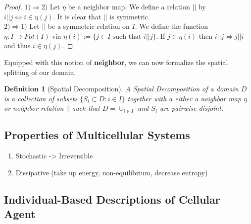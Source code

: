 \documentclass{article}
\newtheorem{definition}{Definition}[section]
\begin{document}
\begin{proof}
    $1) \Rightarrow 2)$ Let $\eta$ be a neighbor map.
    We define a relation $||$ by $i||j \Leftrightarrow i\in\eta(j)$.
    It is clear that $||$ is symmetric.\\
    $2) \Rightarrow 1)$ Let $||$ be a symmetric relation on $I$.
    We define the function $\eta:I\rightarrow Pot(I)$ via
    $\eta(i):=\{j\in I \text{ such that } i||j\}$.
    If $j\in\eta(i)$ then $i||j \Leftrightarrow j||i$ and thus $i\in\eta(j)$.
\end{proof}

Equipped with this notion of \textbf{neighbor}, we can now formalize the spatial splitting of our
domain.

\begin{definition}[Spatial Decomposition]
    A Spatial Decomposition of a domain $D$ is a collection of subsets
    $\{S_i\subset D: i\in I\}$ together with a either a neighbor map $\eta$ or neighbor relation
    $||$ such that $D=\cup_{i\in I}$ and $S_i$ are pairwise disjoint.
\end{definition}

\subsection{Properties of Multicellular Systems}
\label{subsec:introduction-properties}

\begin{enumerate}
    \item Stochastic -> Irreversible
    \item Dissipative (take up energy, non-equilibrium, decrease entropy)
\end{enumerate}


\subsection{Individual-Based Descriptions of Cellular Agent}
\label{subsec:introduction-individual-descriptions}
\end{document}
